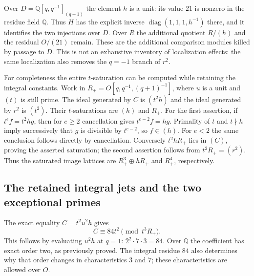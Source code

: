 Over $D=\mathbb Q[q,q^{-1}]_{(q-1)}$ the element $h$ is a unit: its value
$21$ is nonzero in the residue field $\mathbb Q$. Thus $H$ has the explicit
inverse $\operatorname{diag}(1,1,1,h^{-1})$ there, and it identifies
the two injections over $D$. Over $R$ the additional quotient $R/(h)$
and the residual $O/(21)$ remain. These are the additional comparison
modules killed by passage to $D$. This is not an exhaustive inventory
of localization effects: the same localization also removes the $q=-1$
branch of $r^2$.

For completeness the entire $t$-saturation can be computed while retaining
the integral constants. Work in
$R_+=O[q,q^{-1},(q+1)^{-1}]$, where $u$ is a unit and $(t)$ is still
prime. The ideal generated by $C$ is $(t^2h)$ and the ideal generated
by $r^2$ is $(t^2)$. Their $t$-saturations are $(h)$ and $R_+$.
For the first assertion, if $t^ef=t^2hg$, then for $e\ge2$ cancellation
gives $t^{e-2}f=hg$. Primality of $t$ and $t\nmid h$ imply successively
that $g$ is divisible by $t^{e-2}$, so $f\in(h)$. For $e<2$ the same
conclusion follows directly by cancellation. Conversely $t^2hR_+$ lies
in $(C)$, proving the asserted saturation; the second assertion follows
from $t^2R_+=(r^2)$. Thus the saturated image lattices are
$R_+^3\oplus hR_+$ and $R_+^4$, respectively.

\subsection{The retained integral jets and the two exceptional primes}

The exact equality $C=t^2u^2h$ gives
\[
 C\equiv84t^2\pmod{t^3R_+}.
\]
This follows by evaluating $u^2h$ at $q=1$: $2^2\cdot7\cdot3=84$.
Over $\mathbb Q$ the coefficient has exact order two, as previously proved.
The integral residue $84$ also determines why that order changes in
characteristics $3$ and $7$; these characteristics are allowed over $O$.

